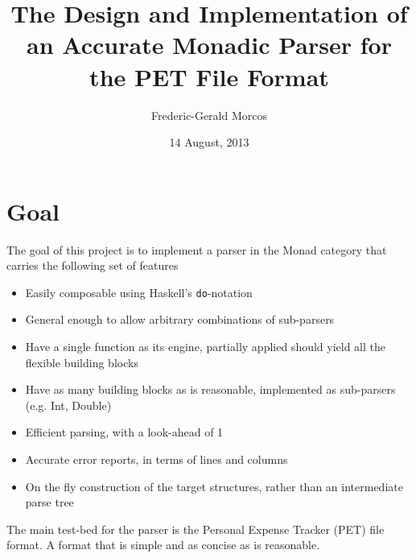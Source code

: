 \documentclass{article}
\title{The Design and Implementation of an Accurate Monadic Parser for the PET File Format}
\author{Frederic-Gerald Morcos}
\date{14 August, 2013}
\begin{document}
	\maketitle
	\pagebreak

  \section{Goal}
  \label{sec:goal}
  
  The goal of this project is to implement a parser in the Monad category that carries the following set of features
  
  \begin{itemize}
  
	\item Easily composable using Haskell's \texttt{do}-notation
	
	\item General enough to allow arbitrary combinations of sub-parsers
	
	\item Have a single function as its engine, partially applied should yield all the flexible building blocks
	
	\item Have as many building blocks as is reasonable, implemented as sub-parsers (e.g. Int, Double)
	
	\item Efficient parsing, with a look-ahead of 1
	
	\item Accurate error reports, in terms of lines and columns
	
	\item On the fly construction of the target structures, rather than an intermediate parse tree
	
  \end{itemize}
  
  The main test-bed for the parser is the Personal Expense Tracker (PET) file format. A format that is simple and as concise as is reasonable.

\end{document}

